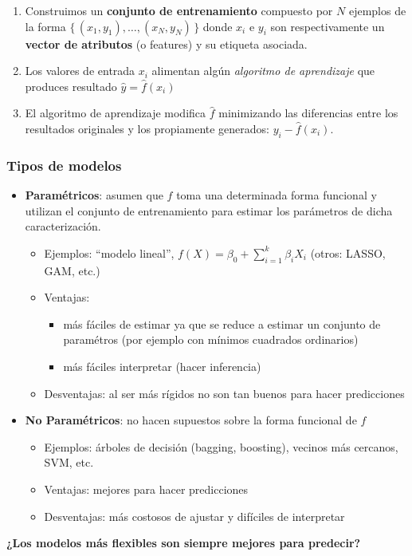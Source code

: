 \documentclass[leqno, 10pt, envcountsect]{beamer}
\numberwithin{equation}{section}
\theoremstyle{definition}
\theoremstyle{example}
\numberwithin{figure}{section}
\numberwithin{table}{section}
\let\olditem\item
\renewcommand{\item}{%
\olditem\vspace{1pt}}
\begin{document}
\begin{frame}[fragile=singleslide]
\begin{itemize}
\begin{itemize}
\begin{enumerate}
            \item Construimos un \textbf{conjunto de entrenamiento} compuesto
              por $N$ ejemplos de la forma $\{\, (x_{1}, y_{1}), \ldots, (x_{N},
              y_{N}) \,\}$ donde $x_{i}$ e $y_{i}$ son respectivamente un
              \textbf{vector de atributos} (o features) y su etiqueta asociada.
            \item Los valores de entrada $x_{i}$ alimentan algún
              \textit{algoritmo de aprendizaje} que produces resultado $\hat{y}
              = \hat{f}(x_{i})$
            \item El algoritmo de aprendizaje modifica $\hat{f}$ minimizando las
              diferencias entre los resultados originales y los propiamente
              generados: $y_{i} - \hat{f}(x_{i})$.
          \end{enumerate}
      \end{itemize}
  \end{itemize}
\end{frame}
\begin{frame}[fragile=singleslide]
  \frametitle{Tipos de modelos}
  \begin{itemize}
    \item \textbf{Paramétricos}: asumen que $f$ toma una determinada forma
      funcional y utilizan el conjunto de entrenamiento para estimar los
      parámetros de dicha caracterización.
      \begin{itemize}
        \item Ejemplos: \enquote{modelo lineal},  $f(X) = \beta_{0} +
          \sum_{i=1}^{k}\beta_{i}{X}_{i}$ (otros: LASSO, GAM, etc.)
        \item Ventajas:
      \begin{itemize}
        \item más fáciles de estimar ya que se reduce a estimar un
          conjunto de paramétros (por ejemplo con mínimos cuadrados ordinarios)
        \item más fáciles interpretar (hacer inferencia)
      \end{itemize}
        \item Desventajas: al ser más rígidos no son tan buenos para hacer
          predicciones
      \end{itemize}
    \item \textbf{No Paramétricos}: no hacen supuestos sobre la forma funcional de $f$
      \begin{itemize}
        \item Ejemplos: árboles de decisión (bagging, boosting), vecinos más
          cercanos, SVM, etc.
        \item Ventajas: mejores para hacer predicciones
        \item Desventajas: más costosos de ajustar y difíciles de interpretar
      \end{itemize}
  \end{itemize}

  \textbf{¿Los modelos más flexibles son siempre mejores para predecir?}
\end{frame}
\end{document}
